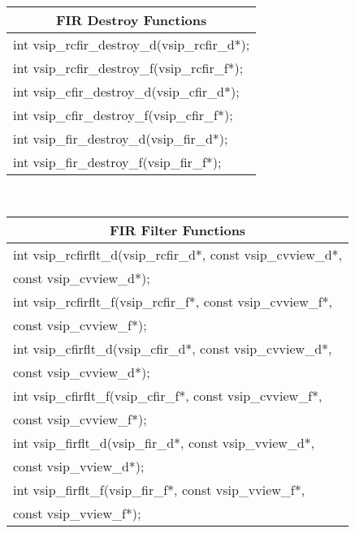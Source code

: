 \\ \hspace*{1.cm} {
\ttfamily
\begin{tabular}[H]{|l|}
\multicolumn{1}{c}{\rmfamily \bfseries FIR Destroy Functions\vspace{.1cm}}\\ \hline
int vsip\_rcfir\_destroy\_d(vsip\_rcfir\_d*);\\
int vsip\_rcfir\_destroy\_f(vsip\_rcfir\_f*);\\
int vsip\_cfir\_destroy\_d(vsip\_cfir\_d*);\\
int vsip\_cfir\_destroy\_f(vsip\_cfir\_f*);\\
int vsip\_fir\_destroy\_d(vsip\_fir\_d*);\\
int vsip\_fir\_destroy\_f(vsip\_fir\_f*);\\\hline
\end{tabular}\vspace{.1cm}
}\vspace{.1cm}
\\ \hspace*{1.cm} {
\ttfamily
\begin{tabular}[H]{|l|}
\multicolumn{1}{c}{\rmfamily \bfseries FIR Filter Functions\vspace{.1cm}}\\ \hline
int vsip\_rcfirflt\_d(vsip\_rcfir\_d*, const vsip\_cvview\_d*,\\*\hspace{.7cm}const vsip\_cvview\_d*);\\
int vsip\_rcfirflt\_f(vsip\_rcfir\_f*, const vsip\_cvview\_f*,\\*\hspace{.7cm}const vsip\_cvview\_f*);\\
int vsip\_cfirflt\_d(vsip\_cfir\_d*, const vsip\_cvview\_d*,\\*\hspace{.7cm}const vsip\_cvview\_d*);\\
int vsip\_cfirflt\_f(vsip\_cfir\_f*, const vsip\_cvview\_f*,\\*\hspace{.7cm}const vsip\_cvview\_f*);\\
int vsip\_firflt\_d(vsip\_fir\_d*, const vsip\_vview\_d*,\\*\hspace{.7cm}const vsip\_vview\_d*);\\
int vsip\_firflt\_f(vsip\_fir\_f*, const vsip\_vview\_f*,\\*\hspace{.7cm}const vsip\_vview\_f*);\\\hline
\end{tabular}\vspace{.1cm}
}
